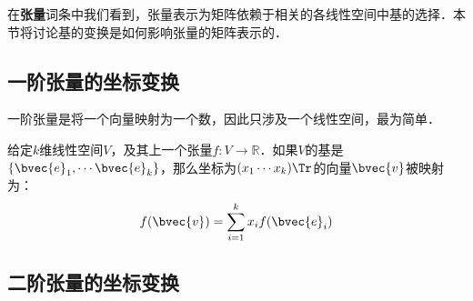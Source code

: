 

在\textbf{张量}词条中我们看到，张量表示为矩阵依赖于相关的各线性空间中基的选择．本节将讨论基的变换是如何影响张量的矩阵表示的．

\subsection{一阶张量的坐标变换}
一阶张量是将一个向量映射为一个数，因此只涉及一个线性空间，最为简单．

给定$k$维线性空间$V$，及其上一个张量$f:V\rightarrow\mathbb{R}$．如果$V$的基是$\{\bvec{e}_1, \cdots\bvec{e}_k\}$，那么坐标为$(x_1\cdots x_k)\Tr$的向量$\bvec{v}$被映射为：
\begin{equation}
f(\bvec{v})=\sum\limits_{i=1}^k x_if(\bvec{e}_i)
\end{equation}



\subsection{二阶张量的坐标变换}

